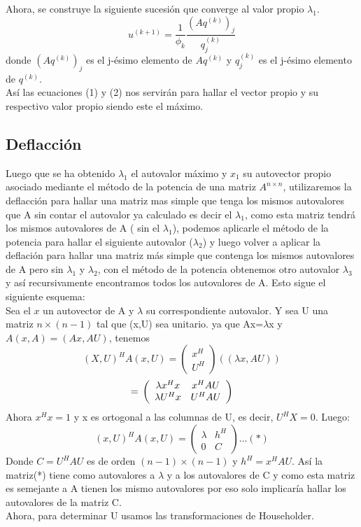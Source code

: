 \documentclass[12pt,a4paper]{article}
\begin{document}
\begin{multicols}{2}
Ahora, se construye la siguiente sucesión que converge al valor propio $\lambda_{1}$.
\begin{equation}\label{eigenvalue_iter}
u^{(k+1)} = \frac{1}{\phi_{k}}\frac{(Aq^{(k)})_{j}}{q^{(k)}_{j}}
\end{equation}
donde $(Aq^{(k)})_{j}$ es el j-ésimo elemento de $Aq^{(k)}$ y $q^{(k)}_{j}$ es el j-ésimo elemento de $q^{(k)}.$\\
Así las ecuaciones (1) y (2) nos servirán para hallar el vector propio y su respectivo valor propio siendo este el máximo.


\subsection{Deflacción}
\noindent Luego que se ha obtenido $\lambda_{1}$ el autovalor máximo y $x_{1}$ su autovector propio asociado mediante el método de la potencia de una matriz $A^{n\times n}$, utilizaremos la deflacción para hallar una matriz mas simple que tenga los mismos autovalores que A sin contar el autovalor ya calculado es decir el $\lambda_{1}$, como esta matriz tendrá los mismos autovalores de A ( sin el $\lambda_{1}$), podemos aplicarle el método de la potencia para hallar el siguiente autovalor ($\lambda_{2}$) y luego volver a aplicar la deflación para hallar una matriz más simple que contenga los mismos autovalores de A pero sin $\lambda_{1}$ y $\lambda_{2}$, con el método de la potencia obtenemos otro autovalor $\lambda_{3}$ y así recursivamente encontramos todos los autovalores de A.
Esto sigue el siguiente esquema:\\
Sea el $x$ un autovector de A y $\lambda $ su correspondiente autovalor. Y sea U una matriz $n\times(n-1)$ tal que (x,U) sea unitario. ya que Ax=$\lambda$x y $A(x,A)=(Ax,AU)$, tenemos$$(X,U)^{H}A(x,U)=\left(\begin{array}{c}
    x^{H} \\
     U^{H} 
\end{array}\right)\left((\lambda x,AU)\right)$$ $$=\newline \left(\begin{array}{cc}
   \lambda x^{H}x  &  x^{H}AU\\
   \lambda U^{H}x  & U^{H}AU
\end{array}\right)$$
Ahora $x^{H}x=1$  y x es ortogonal a las columnas de U, es decir, $U^{H}X=0$. Luego:\\
$$(x,U)^{H}A(x,U)=\left(\begin{array}{cc}
  \lambda   &  h^{H}\\
    0 & C
\end{array}\right)...(*)$$ Donde $C=U^{H}AU$ es de orden  $(n-1)\times (n-1)$ y $h^{H}=x^{H}AU$. Así la matriz(*) tiene como autovalores a $\lambda$ y a los autovalores de C y como esta matriz es semejante a A tienen los mismo autovalores por eso solo implicaría hallar los autovalores de la matriz C.\\
Ahora, para determinar U usamos las transformaciones de Householder.\\


\end{multicols}
\end{document}
